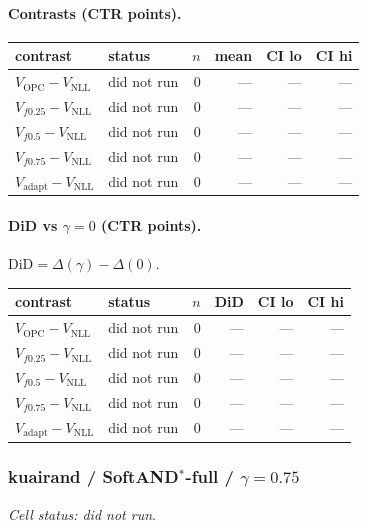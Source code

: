 \documentclass[10pt,a4paper]{article}
\begin{document}
\paragraph{Contrasts (CTR points).}
{\centering\small\begin{tabular}{llrrrr}
\toprule contrast & status & $n$ & mean & CI lo & CI hi \\
\midrule
$V_{\mathrm{OPC}}-V_{\mathrm{NLL}}$ & did not run & 0 & --- & --- & --- \\
$V_{f0.25}-V_{\mathrm{NLL}}$ & did not run & 0 & --- & --- & --- \\
$V_{f0.5}-V_{\mathrm{NLL}}$ & did not run & 0 & --- & --- & --- \\
$V_{f0.75}-V_{\mathrm{NLL}}$ & did not run & 0 & --- & --- & --- \\
$V_{\mathrm{adapt}}-V_{\mathrm{NLL}}$ & did not run & 0 & --- & --- & --- \\
\bottomrule\end{tabular}\par}
\paragraph{DiD vs $\gamma=0$ (CTR points).} $\mathrm{DiD}=\Delta(\gamma)-\Delta(0)$.
{\centering\small\begin{tabular}{llrrrr}
\toprule contrast & status & $n$ & DiD & CI lo & CI hi \\
\midrule
$V_{\mathrm{OPC}}-V_{\mathrm{NLL}}$ & did not run & 0 & --- & --- & --- \\
$V_{f0.25}-V_{\mathrm{NLL}}$ & did not run & 0 & --- & --- & --- \\
$V_{f0.5}-V_{\mathrm{NLL}}$ & did not run & 0 & --- & --- & --- \\
$V_{f0.75}-V_{\mathrm{NLL}}$ & did not run & 0 & --- & --- & --- \\
$V_{\mathrm{adapt}}-V_{\mathrm{NLL}}$ & did not run & 0 & --- & --- & --- \\
\bottomrule\end{tabular}\par}
\bigskip
\subsubsection{kuairand / SoftAND$^*$-full / $\gamma=0.75$}
\emph{Cell status: did not run}.
\end{document}
